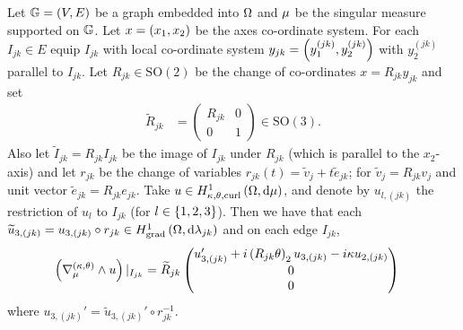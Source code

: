 \begin{cory} \label{cory:ktTanCurlsGraphs}
	Let $\mathbb{G}=\left( V,E \right)$ be a graph embedded into $\Omega$ and $\mu$ be the singular measure supported on $\mathbb{G}$.
	Let $x=\left( x_1,x_2 \right)$ be the axes co-ordinate system.
	For each $I_{jk}\in E$ equip $I_{jk}$ with local co-ordinate system $y_{jk}=\left( y_1^{(jk)}, y_2^{(jk)} \right)$ with $y_2^{(jk)}$ parallel to $I_{jk}$.
	Let $R_{jk}\in\mathrm{SO}(2)$ be the change of co-ordinates $x=R_{jk}y_{jk}$ and set
	\begin{align*}
		\widetilde{R}_{jk} &= \begin{pmatrix} R_{jk} & 0 \\ 0 & 1 \end{pmatrix} \in \mathrm{SO}(3).
	\end{align*}
	Also let $\widetilde{I}_{jk} = R_{jk}I_{jk}$ be the image of $I_{jk}$ under $R_{jk}$ (which is parallel to the $x_2$-axis) and let $r_{jk}$ be the change of variables $r_{jk}(t) = \widetilde{v}_j + t\widetilde{e}_{jk}$; for $\widetilde{v}_j = R_{jk}v_j$ and unit vector $\widetilde{e}_{jk} = R_{jk}e_{jk}$.
	Take $u\in H^1_{\kappa,\theta,\mathrm{curl}}\left( \Omega, \mathrm{d}\mu \right)$, and denote by $u_{l,(jk)}$ the restriction of $u_l$ to $I_{jk}$ (for $l\in\left\{ 1,2,3 \right\}$).
	Then we have that each $\widetilde{u}_{3,(jk)} = u_{3,(jk)}\circ r_{jk}\in H^1_\mathrm{grad}\left( \Omega, \mathrm{d}\lambda_{jk} \right)$ and on each edge $I_{jk}$,
	\begin{align*}
		\left( \nabla_{\mu}^{\left( \kappa, \theta \right)}\wedge u \right)\vert_{I_{jk}} &= \widetilde{R}_{jk} \begin{pmatrix} u_{3,(jk)}' + i\left( R_{jk}\theta \right)_2 u_{3,(jk)} - i\kappa u_{2,(jk)} \\ 0 \\ 0 \end{pmatrix}
	\end{align*}
	where $u_{3,(jk)}' = \widetilde{u}_{3,(jk)}' \circ r_{jk}^{-1}$.
\end{cory}

